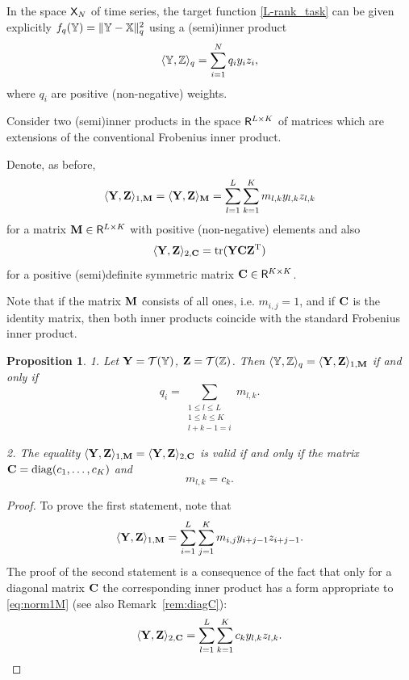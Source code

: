 \documentclass[sii]{ipart}
\DeclareMathOperator{\tr}{tr}
\newtheorem{proposition}{Proposition}
\begin{document}
In the space $\mathsf{X}_N$ of time series, the target function \eqref{L-rank_task} can be given explicitly $f_q(\mathbb{Y})=\|\mathbb{Y}-\mathbb{X}\|_q^2$ using a (semi)inner product
\begin{equation}
\label{eq:norm_ser}
\langle\tsY,\tsZ\rangle_q = \sum_{i = 1}^N q_i y_i z_i,
\end{equation}
where $q_i$ are positive (non-negative) weights.

Consider two (semi)inner products in the space $\mathsf{R}^{L \times K}$ of matrices which are extensions of the conventional Frobenius inner product.

Denote, as before,
\begin{equation}
\label{eq:norm1M}
\langle\bfY,\bfZ\rangle_{1,\bfM} = \langle\bfY,\bfZ\rangle_{\bfM} = \sum_{l = 1}^L \sum_{k=1}^K m_{l,k} y_{l,k} z_{l,k}
\end{equation}
for a matrix $\mathbf{M}\in \mathsf{R}^{L\times K}$ with positive (non-negative) elements and also
\begin{equation}
\label{eq:norm2S}
\langle\bfY,\bfZ\rangle_{2,\bfC} = \tr(\bfY \bfC \bfZ^\rmT)
\end{equation}
for a positive (semi)definite symmetric matrix $\mathbf{C} \in \mathsf{R}^{K\times K}$.

Note that if the matrix $\mathbf{M}$ consists of all ones, i.e. $m_{i,j}=1$,
and if $\mathbf{C}$ is the identity matrix, then both inner products coincide with the standard Frobenius inner product.

\begin{proposition}
	\label{prop:equiv_tasks}
	1. Let $\mathbf{Y} = \mathcal{T}(\mathbb{Y})$,  $\mathbf{Z} = \mathcal{T}(\mathbb{Z})$. Then $\langle\mathbb{Y},\mathbb{Z}\rangle_q= \langle \mathbf{Y},\mathbf{Z} \rangle_{1,\mathbf{M}}$ if and only if
	\begin{equation}\label{qi_mi}
	q_i = \sum_{\substack{1 \le l \le L \\ 1 \le k \le K \\ l+k-1=i}} m_{l,k}.
	\end{equation}
	
	2. The equality $\langle\mathbf{Y},\mathbf{Z}\rangle_{1,\mathbf{M}}= \langle\mathbf{Y},\mathbf{Z}\rangle_{2,\mathbf{C}}$ is valid if and only if
the matrix $\mathbf{C}=\mathop{\mathrm{diag}}(c_1,\ldots,c_K)$ and
	\begin{equation}\label{sk_mlk}
	m_{l,k}=c_k.
	\end{equation}
\end{proposition}
\begin{proof}
	To prove the first statement, note that
	\begin{equation*}
	\langle \bfY, \bfZ \rangle_{1,\bfM} = \sum_{i = 1}^L \sum_{j = 1}^K m_{i,j} y_{i + j - 1} z_{i + j - 1}.
	\end{equation*}
The proof of the second statement is a consequence of the fact that only for a diagonal matrix $\mathbf{C}$ the corresponding inner product has a form appropriate to \eqref{eq:norm1M} (see also Remark~\ref{rem:diagC}):
	\begin{equation*}
	\langle \bfY, \bfZ \rangle_{2,\bfC} = \sum_{l=1}^L \sum_{k=1}^K c_k y_{l,k} z_{l, k}.
	\end{equation*}
\end{proof}
\end{document}
